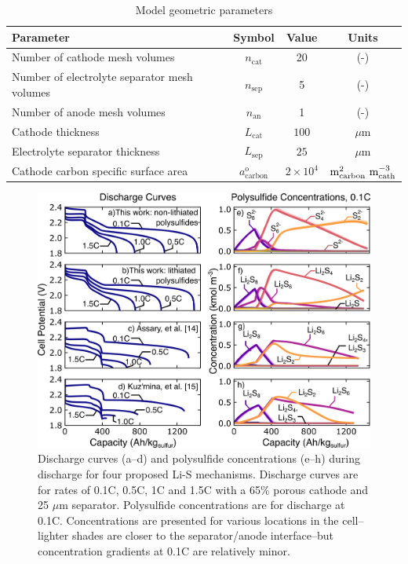 \documentclass{elsarticle}
\begin{document}
\begin{table}[t!]
\begin{center}
\begin{tabular}{ lccc } 
    \hline\hline
    {\bf Parameter} & {\bf Symbol} & {\bf Value} & {\bf Units}\\
    \hline
    Number of cathode mesh volumes & $n_\mathrm{cat}$ & 20 & (-)\\
    Number of electrolyte separator mesh volumes & $n_\mathrm{sep}$ & 5 & (-)\\
    Number of anode mesh volumes & $n_\mathrm{an}$ & 1 & (-)\\
    Cathode thickness & $L_\mathrm{cat}$ & $100$ & $ \mu \mathrm{m}$ \\
    Electrolyte separator thickness & $L_\mathrm{sep}$ & $25$ & $ \mu \mathrm{m}$ \\
    Cathode carbon specific surface area & $a^\mathrm{o}_\mathrm{carbon}$ & $2 \times 10^{4}$ & $\mathrm{m}^{2}_{\rm carbon} ~ \mathrm{m}^{-3}_{\rm cath}$  \\
    \hline\hline
\end{tabular}
\caption{Model geometric parameters}
\label{table:modelparams}
\end{center}
\end{table}  
\begin{figure}[b!]
    \centering
    \includegraphics[width=\textwidth]{Figures/Figure3_Mechanism_Comparison.png}
    \caption{Discharge curves (a--d) and polysulfide concentrations (e--h) during discharge for four proposed Li-S mechanisms.  Discharge curves are for rates of 0.1C, 0.5C, 1C and 1.5C with a 65\% porous cathode and 25 $\mu$m separator. Polysulfide concentrations are for discharge at 0.1C. Concentrations are presented for various locations in the cell--lighter shades are closer to the separator/anode interface--but concentration gradients at 0.1C are relatively minor.}
    \label{fig:mechanismcomparison}
\end{figure}
\end{document}
